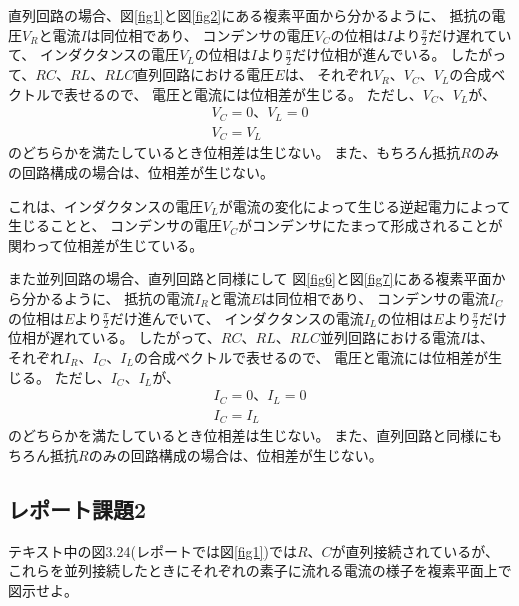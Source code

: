 \documentclass[12pt]{jarticle}
\begin{document}
直列回路の場合、図\ref{fig1}と図\ref{fig2}にある複素平面から分かるように、
抵抗の電圧$V_R$と電流$I$は同位相であり、
コンデンサの電圧$V_C$の位相は$I$より$\frac{\pi}{2}$だけ遅れていて、
インダクタンスの電圧$V_L$の位相は$I$より$\frac{\pi}{2}$だけ位相が進んでいる。
したがって、$RC$、$RL$、$RLC$直列回路における電圧$E$は、
それぞれ$V_R$、$V_C$、$V_L$の合成ベクトルで表せるので、
電圧と電流には位相差が生じる。
ただし、$V_C$、$V_L$が、
\begin{eqnarray}
    V_C=0、V_L=0 \label{eq31}\\
    V_C=V_L \label{eq32}
\end{eqnarray}
のどちらかを満たしているとき位相差は生じない。
また、もちろん抵抗$R$のみの回路構成の場合は、位相差が生じない。

これは、インダクタンスの電圧$V_L$が電流の変化によって生じる逆起電力によって生じることと、
コンデンサの電圧$V_C$がコンデンサにたまって形成されることが関わって位相差が生じている。

また並列回路の場合、直列回路と同様にして
図\ref{fig6}と図\ref{fig7}にある複素平面から分かるように、
抵抗の電流$I_R$と電流$E$は同位相であり、
コンデンサの電流$I_C$の位相は$E$より$\frac{\pi}{2}$だけ進んでいて、
インダクタンスの電流$I_L$の位相は$E$より$\frac{\pi}{2}$だけ位相が遅れている。
したがって、$RC$、$RL$、$RLC$並列回路における電流$I$は、
それぞれ$I_R$、$I_C$、$I_L$の合成ベクトルで表せるので、
電圧と電流には位相差が生じる。
ただし、$I_C$、$I_L$が、
\begin{eqnarray}
    I_C=0、I_L=0 \label{eq33}\\
    I_C=I_L \label{eq34}
\end{eqnarray}
のどちらかを満たしているとき位相差は生じない。
また、直列回路と同様にもちろん抵抗$R$のみの回路構成の場合は、位相差が生じない。

\clearpage

\subsection{レポート課題2}
\begin{shadebox}
    テキスト中の図3.24(レポートでは図\ref{fig1})では$R$、$C$が直列接続されているが、
    これらを並列接続したときにそれぞれの素子に流れる電流の様子を複素平面上で図示せよ。
\end{shadebox}
\end{document}
